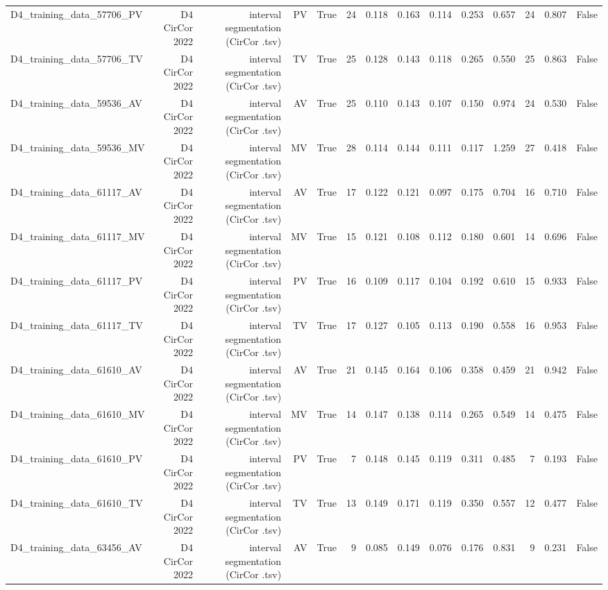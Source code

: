 \begin{table}[htbp]
\begin{tabular}{lrrrrrrrrrrrrr}
    D4\_training\_data\_57706\_PV & D4 CirCor 2022 & interval segmentation (CirCor .tsv) & PV & True & 24 & 0.118 & 0.163 & 0.114 & 0.253 & 0.657 & 24 & 0.807 & False \\
    D4\_training\_data\_57706\_TV & D4 CirCor 2022 & interval segmentation (CirCor .tsv) & TV & True & 25 & 0.128 & 0.143 & 0.118 & 0.265 & 0.550 & 25 & 0.863 & False \\
    D4\_training\_data\_59536\_AV & D4 CirCor 2022 & interval segmentation (CirCor .tsv) & AV & True & 25 & 0.110 & 0.143 & 0.107 & 0.150 & 0.974 & 24 & 0.530 & False \\
    D4\_training\_data\_59536\_MV & D4 CirCor 2022 & interval segmentation (CirCor .tsv) & MV & True & 28 & 0.114 & 0.144 & 0.111 & 0.117 & 1.259 & 27 & 0.418 & False \\
    D4\_training\_data\_61117\_AV & D4 CirCor 2022 & interval segmentation (CirCor .tsv) & AV & True & 17 & 0.122 & 0.121 & 0.097 & 0.175 & 0.704 & 16 & 0.710 & False \\
    D4\_training\_data\_61117\_MV & D4 CirCor 2022 & interval segmentation (CirCor .tsv) & MV & True & 15 & 0.121 & 0.108 & 0.112 & 0.180 & 0.601 & 14 & 0.696 & False \\
    D4\_training\_data\_61117\_PV & D4 CirCor 2022 & interval segmentation (CirCor .tsv) & PV & True & 16 & 0.109 & 0.117 & 0.104 & 0.192 & 0.610 & 15 & 0.933 & False \\
    D4\_training\_data\_61117\_TV & D4 CirCor 2022 & interval segmentation (CirCor .tsv) & TV & True & 17 & 0.127 & 0.105 & 0.113 & 0.190 & 0.558 & 16 & 0.953 & False \\
    D4\_training\_data\_61610\_AV & D4 CirCor 2022 & interval segmentation (CirCor .tsv) & AV & True & 21 & 0.145 & 0.164 & 0.106 & 0.358 & 0.459 & 21 & 0.942 & False \\
    D4\_training\_data\_61610\_MV & D4 CirCor 2022 & interval segmentation (CirCor .tsv) & MV & True & 14 & 0.147 & 0.138 & 0.114 & 0.265 & 0.549 & 14 & 0.475 & False \\
    D4\_training\_data\_61610\_PV & D4 CirCor 2022 & interval segmentation (CirCor .tsv) & PV & True & 7 & 0.148 & 0.145 & 0.119 & 0.311 & 0.485 & 7 & 0.193 & False \\
    D4\_training\_data\_61610\_TV & D4 CirCor 2022 & interval segmentation (CirCor .tsv) & TV & True & 13 & 0.149 & 0.171 & 0.119 & 0.350 & 0.557 & 12 & 0.477 & False \\
    D4\_training\_data\_63456\_AV & D4 CirCor 2022 & interval segmentation (CirCor .tsv) & AV & True & 9 & 0.085 & 0.149 & 0.076 & 0.176 & 0.831 & 9 & 0.231 & False \\

\end{tabular}
\end{table}
